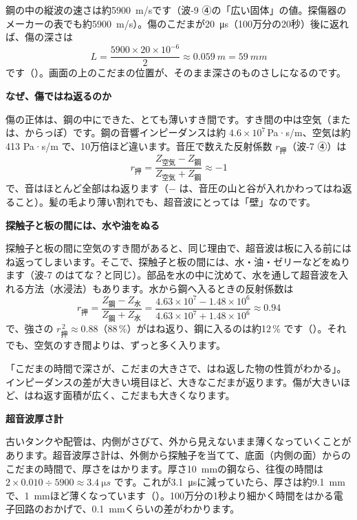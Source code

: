鋼の中の縦波の速さは約\qty{5900}{m/s}です（波-9 ④の「広い固体」の値。探傷器のメーカーの表でも約\qty{5900}{m/s}）。傷のこだまが\qty{20}{\micro s}（100万分の20秒）後に返れば、傷の深さは
\[ L=\frac{5900\times20\times10^{-6}}{2}\approx\qty{0.059}{m}=\qty{59}{mm} \]
です（）。画面の上のこだまの位置が、そのまま深さのものさしになるのです。

\noindent\textbf{なぜ、傷ではね返るのか}\par\nobreak
傷の正体は、鋼の中にできた、とても薄いすき間です。すき間の中は空気（または、からっぽ）です。鋼の音響インピーダンスは約 $4.6\times10^7$\,Pa·s/m、空気は約413 Pa·s/m で、10万倍ほど違います。音圧で数えた反射係数 $r_{\text{押}}$（波-7 ④）は
\[ r_{\text{押}}=\frac{Z_{\text{空気}}-Z_{\text{鋼}}}{Z_{\text{空気}}+Z_{\text{鋼}}}\approx-1 \]
で、音はほとんど全部はね返ります（$-$ は、音圧の山と谷が入れかわってはね返ること）。髪の毛より薄い割れでも、超音波にとっては「壁」なのです。

\noindent\textbf{探触子と板の間には、水や油をぬる}\par\nobreak
探触子と板の間に空気のすき間があると、同じ理由で、超音波は板に入る前にはね返ってしまいます。そこで、探触子と板の間には、水・油・ゼリーなどをぬります（波-7 のはてな？と同じ）。部品を水の中に沈めて、水を通して超音波を入れる方法（水浸法）もあります。水から鋼へ入るときの反射係数は
\[ r_{\text{押}}=\frac{Z_{\text{鋼}}-Z_{\text{水}}}{Z_{\text{鋼}}+Z_{\text{水}}}=\frac{4.63\times10^7-1.48\times10^6}{4.63\times10^7+1.48\times10^6}\approx0.94 \]
で、強さの $r_{\text{押}}^{\,2}\approx0.88$（88\,\%）がはね返り、鋼に入るのは約12\,\% です（）。それでも、空気のすき間よりは、ずっと多く入ります。

\begin{phyomi}[$L=ct/2$ と反射係数]
「こだまの時間で深さが、こだまの大きさで、はね返した物の性質がわかる」。インピーダンスの差が大きい境目ほど、大きなこだまが返ります。傷が大きいほど、はね返す面積が広く、こだまも大きくなります。
\end{phyomi}


\leavevmode\label{ph:波-10:sec4}\noindent\textbf{超音波厚さ計}\par\nobreak
古いタンクや配管は、内側がさびて、外から見えないまま薄くなっていくことがあります。超音波厚さ計は、外側から探触子を当てて、底面（内側の面）からのこだまの時間で、厚さをはかります。厚さ\qty{10}{mm}の鋼なら、往復の時間は $2\times0.010\div5900\approx\qty{3.4}{\micro s}$ です。これが\qty{3.1}{\micro s}に減っていたら、厚さは約\qty{9.1}{mm}で、\qty{1}{mm}ほど薄くなっています（）。100万分の1秒より細かく時間をはかる電子回路のおかげで、\qty{0.1}{mm}くらいの差がわかります。

